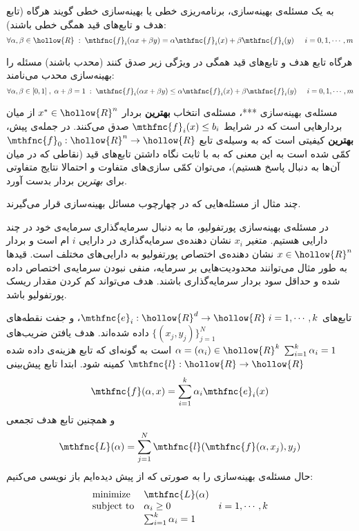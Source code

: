 به یک مسئله‌ی بهینه‌سازی، برنامه‌ریزی خطی
یا بهینه‌سازی خطی
گویند هرگاه (تابع هدف و تابع‌های قید همگی خطی باشند):
\[
\forall \alpha,\beta \in \hollow{R} \; : \; \mthfnc{f}_i( \alpha x + \beta y ) = \alpha \mthfnc{f}_i(x) + \beta \mthfnc{f}_i(y) \hspace{5mm} i = 0,1,\cdots,m
\]

هرگاه تابع هدف و تابع‌های قید همگی در ویژگی زیر صدق کنند (محدب
باشند) مسئله را بهینه‌سازی محدب
می‌نامند:
\[
\forall \alpha,\beta \in [0,1] \; , \; \alpha + \beta = 1 \; : \; \mthfnc{f}_i( \alpha x + \beta y ) \leq \alpha \mthfnc{f}_i(x) + \beta \mthfnc{f}_i(y) \hspace{5mm} i = 0,1,\cdots,m
\]



مسئله‌ی بهینه‌سازی ***، مسئله‌ی انتخاب 
\textbf{
بهترین
} 
بردار 
$x^* \in \hollow{R}^n$ 
از میان بردارهایی است که در شرایط 
$\mthfnc{f}_i(x) \leq b_i$ 
صدق می‌کنند. در جمله‌ی پیش، 
\textbf{
بهترین
} 
کیفیتی است که به وسیله‌ی تابع 
$\mthfnc{f}_0: \hollow{R}^n \rightarrow \hollow{R}$ 
کمّی شده است به این معنی که به با ثابت نگاه داشتن تابع‌های قید (نقاطی که در میان آن‌ها به دنبال پاسخ هستیم)، می‌توان کمّی سازی‌های متفاوت و احتمالا نتایج متفاوتی برای 
\emph{
بهترین
} 
بردار بدست آورد.

چند مثال از مسئله‌هایی که در چهارچوب مسائل بهینه‌سازی قرار می‌گیرند.

در مسئله‌ی بهینه‌سازی پورتفولیو، ما به دنبال سرمایه‌گذاری سرمایه‌ی
خود در چند دارایی
هستیم. متغیر 
$x_i$ 
نشان دهنده‌ی سرمایه‌گذاری در دارایی 
$i$
ام است و بردار 
$x \in \hollow{R}^n$ 
نشان دهنده‌ی اختصاص پورتفولیو به دارایی‌های مختلف است. قیدها به طور مثال می‌توانند محدودیت‌هایی بر سرمایه، منفی نبودن سرمایه‌ی اختصاص داده شده و حداقل سود بردار سرمایه‌گذاری باشند. هدف می‌تواند کم کردن مقدار ریسک
پورتفولیو باشد.


تابع‌های 
$\mthfnc{e}_i : \hollow{R}^d \rightarrow \hollow{R} \; i=1,\cdots,k$، 
و جفت نقطه‌های 
$\{ (x_j, y_j) \}^{N}_{j=1}$ 
داده شده‌اند. هدف یافتن ضریب‌های 
$\alpha = (\alpha_i) \in \hollow{R}^k \; \sum^{k}_{i=1} \alpha_i = 1$ 
است به گونه‌ای که تابع هزینه‌ی داده شده 
$\mthfnc{l} : \hollow{R} \rightarrow \hollow{R}$ 
کمینه شود. ابتدا تابع پیش‌بینی
\[
\mthfnc{f}(\alpha, x) = \sum^{k}_{i=1} \alpha_i \mthfnc{e}_i(x)
\]
و همچنین تابع هدف تجمعی 
\[
\mthfnc{L}(\alpha) = \sum^{N}_{j=1} \mthfnc{l} ( \mthfnc{f}(\alpha, x_j) , y_j )
\]
حال مسئله‌ی بهینه‌سازی را به صورتی که از پیش دیده‌ایم باز نویسی می‌کنیم:
\[
\begin{array}{lll}
\mbox{minimize} & \mthfnc{L}(\alpha) & \\
\mbox{subject to} & \alpha_i \geq 0 & i = 1,\cdots, k\\
& \sum^{k}_{i=1} \alpha_i = 1 & 
\end{array}
\]

